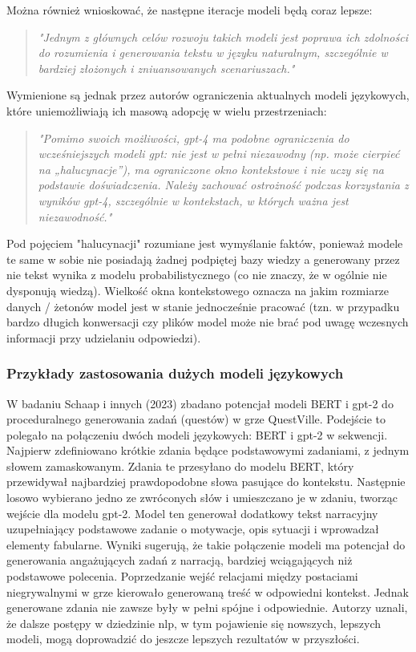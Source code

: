 Można również wnioskować, że następne iteracje modeli będą coraz lepsze:

\begin{quote}
    \textit{"Jednym z głównych celów rozwoju takich modeli jest poprawa ich zdolności do rozumienia i
        generowania tekstu w języku naturalnym, szczególnie w bardziej złożonych i zniuansowanych
        scenariuszach."}\cite{openai2024gpt4}
\end{quote}

Wymienione są jednak przez autorów ograniczenia aktualnych modeli językowych, które uniemożliwiają ich
masową adopcję w wielu przestrzeniach:

\begin{quote}
    \textit{"Pomimo swoich możliwości, \gls{gpt}-4 ma podobne ograniczenia do wcześniejszych modeli \gls{gpt}: nie jest w
        pełni niezawodny (np. może cierpieć na „halucynacje”), ma ograniczone okno kontekstowe i nie uczy
        się na podstawie doświadczenia. Należy zachować ostrożność podczas korzystania z wyników \gls{gpt}-4,
        szczególnie w kontekstach, w których ważna jest niezawodność."}\cite{openai2024gpt4}
\end{quote}

Pod pojęciem "halucynacji" rozumiane jest wymyślanie faktów, ponieważ modele te same w sobie nie posiadają
żadnej podpiętej bazy wiedzy a generowany przez nie tekst wynika z modelu probabilistycznego (co nie
znaczy, że w ogólnie nie dysponują wiedzą). Wielkość okna kontekstowego oznacza na jakim rozmiarze
danych / żetonów model jest w stanie jednocześnie pracować (tzn. w przypadku bardzo długich konwersacji
czy plików model może nie brać pod uwagę wczesnych informacji przy udzielaniu odpowiedzi).

\subsubsection*{Przykłady zastosowania dużych modeli językowych}

W badaniu Schaap i innych (2023)\cite{questville} zbadano potencjał modeli BERT i \gls{gpt}-2
do proceduralnego generowania zadań (questów) w grze QuestVille. Podejście
to polegało na połączeniu dwóch modeli językowych: BERT i \gls{gpt}-2 w sekwencji. Najpierw zdefiniowano krótkie
zdania będące podstawowymi zadaniami, z jednym słowem zamaskowanym. Zdania te przesyłano do modelu
BERT, który przewidywał najbardziej prawdopodobne słowa pasujące do kontekstu. Następnie losowo wybierano
jedno ze zwróconych słów i umieszczano je w zdaniu, tworząc wejście dla modelu \gls{gpt}-2. Model ten generował
dodatkowy tekst narracyjny uzupełniający podstawowe zadanie o motywacje, opis sytuacji i wprowadzał
elementy fabularne. Wyniki sugerują, że takie połączenie modeli ma potencjał do generowania angażujących
zadań z narracją, bardziej wciągających niż podstawowe polecenia. Poprzedzanie wejść relacjami
między postaciami niegrywalnymi w grze kierowało generowaną treść w odpowiedni kontekst. Jednak
generowane zdania nie zawsze były w pełni spójne i odpowiednie. Autorzy uznali, że dalsze postępy w
dziedzinie \gls{nlp}, w tym pojawienie się nowszych, lepszych modeli, mogą doprowadzić do jeszcze lepszych
rezultatów w przyszłości.\cite{questville}

